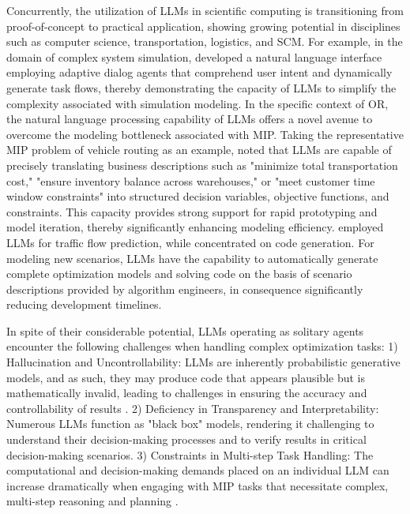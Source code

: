 \documentclass[preprint,12pt]{elsarticle}
\begin{document}
Concurrently, the utilization of LLMs in scientific computing is transitioning from proof-of-concept to practical application, showing growing potential in disciplines such as computer science, transportation, logistics, and SCM. For example, in the domain of complex system simulation, \citet{liAdaptiveTODLLMdrivenAdaptive2025a} developed a natural language interface employing adaptive dialog agents that comprehend user intent and dynamically generate task flows, thereby demonstrating the capacity of LLMs to simplify the complexity associated with simulation modeling. In the specific context of OR, the natural language processing capability of LLMs offers a novel avenue to overcome the modeling bottleneck associated with MIP. Taking the representative MIP problem of vehicle routing as an example, \citet{jiangDROCELEVATINGLARGE2025a} noted that LLMs are capable of precisely translating business descriptions such as "minimize total transportation cost," "ensure inventory balance across warehouses," or "meet customer time window constraints" into structured decision variables, objective functions, and constraints. This capacity provides strong support for rapid prototyping and model iteration, thereby significantly enhancing modeling efficiency. \citet{liuSTLLMGraphEnhanced2025} employed LLMs for traffic flow prediction, while \citet{ishibashiSelfOrganizedAgentsLLM2024} concentrated on code generation. For modeling new scenarios, LLMs have the capability to automatically generate complete optimization models and solving code on the basis of scenario descriptions provided by algorithm engineers, in consequence significantly reducing development timelines. 

In spite of their considerable potential, LLMs operating as solitary agents encounter the following challenges when handling complex optimization tasks:
1) Hallucination and Uncontrollability: LLMs are inherently probabilistic generative models, and as such, they may produce code that appears plausible but is mathematically invalid, leading to challenges in ensuring the accuracy and controllability of results \citep{huangSurveyHallucinationLarge2025}.
2) Deficiency in Transparency and Interpretability: Numerous LLMs function as "black box" models, rendering it challenging to understand their decision-making processes and to verify results in critical decision-making scenarios.
3) Constraints in Multi-step Task Handling: The computational and decision-making demands placed on an individual LLM can increase dramatically when engaging with MIP tasks that necessitate complex, multi-step reasoning and planning \citep{labanLLMsGetLost2025a}.
\end{document}
